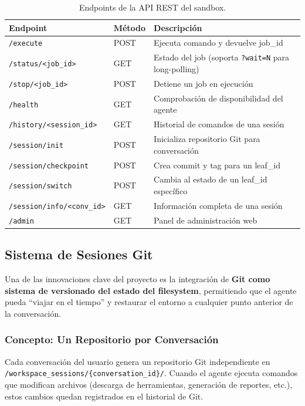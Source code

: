 \begin{table}[H]
\centering
\renewcommand{\arraystretch}{1.2}
\small
\begin{tabular}{|l|l|p{6cm}|}
\hline
\rowcolor[gray]{0.85}
\textbf{Endpoint} & \textbf{Método} & \textbf{Descripción} \\
\hline
\texttt{/execute} & POST & Ejecuta comando y devuelve job\_id \\
\hline
\texttt{/status/<job\_id>} & GET & Estado del job (soporta \texttt{?wait=N} para long-polling) \\
\hline
\texttt{/stop/<job\_id>} & POST & Detiene un job en ejecución \\
\hline
\texttt{/health} & GET & Comprobación de disponibilidad del agente \\
\hline
\texttt{/history/<session\_id>} & GET & Historial de comandos de una sesión \\
\hline
\texttt{/session/init} & POST & Inicializa repositorio Git para conversación \\
\hline
\texttt{/session/checkpoint} & POST & Crea commit y tag para un leaf\_id \\
\hline
\texttt{/session/switch} & POST & Cambia al estado de un leaf\_id específico \\
\hline
\texttt{/session/info/<conv\_id>} & GET & Información completa de una sesión \\
\hline
\texttt{/admin} & GET & Panel de administración web \\
\hline
\end{tabular}
\caption{Endpoints de la API REST del sandbox.}
\label{tab:endpoints_sandbox}
\end{table}

\subsection{Sistema de Sesiones Git}

Una de las innovaciones clave del proyecto es la integración de \textbf{Git como sistema de versionado del estado del filesystem}, permitiendo que el agente pueda ``viajar en el tiempo'' y restaurar el entorno a cualquier punto anterior de la conversación.

\subsubsection{Concepto: Un Repositorio por Conversación}

Cada conversación del usuario genera un repositorio Git independiente en \texttt{/workspace\_sessions/\{conversation\_id\}/}. Cuando el agente ejecuta comandos que modifican archivos (descarga de herramientas, generación de reportes, etc.), estos cambios quedan registrados en el historial de Git.


